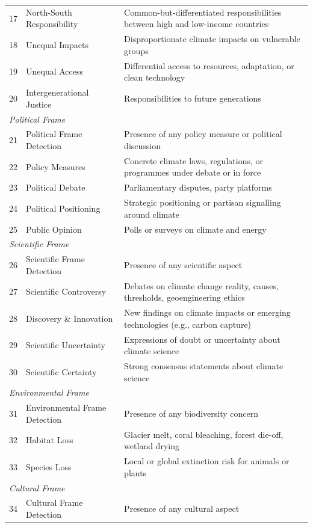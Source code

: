 {\begin{longtable}{p{0.5cm}p{5cm}p{16cm}}
17 & North-South Responsibility & Common-but-differentiated responsibilities between high and low-income countries \\
18 & Unequal Impacts & Disproportionate climate impacts on vulnerable groups \\
19 & Unequal Access & Differential access to resources, adaptation, or clean technology \\
20 & Intergenerational Justice & Responsibilities to future generations \\
\midrule
\multicolumn{3}{l}{\textit{Political Frame}} \\
21 & Political Frame Detection & Presence of any policy measure or political discussion \\
22 & Policy Measures & Concrete climate laws, regulations, or programmes under debate or in force \\
23 & Political Debate & Parliamentary disputes, party platforms \\
24 & Political Positioning & Strategic positioning or partisan signalling around climate \\
25 & Public Opinion & Polls or surveys on climate and energy \\
\midrule
\multicolumn{3}{l}{\textit{Scientific Frame}} \\
26 & Scientific Frame Detection & Presence of any scientific aspect \\
27 & Scientific Controversy & Debates on climate change reality, causes, thresholds, geoengineering ethics \\
28 & Discovery \& Innovation & New findings on climate impacts or emerging technologies (e.g., carbon capture) \\
29 & Scientific Uncertainty & Expressions of doubt or uncertainty about climate science \\
30 & Scientific Certainty & Strong consensus statements about climate science \\
\midrule
\multicolumn{3}{l}{\textit{Environmental Frame}} \\
31 & Environmental Frame Detection & Presence of any biodiversity concern \\
32 & Habitat Loss & Glacier melt, coral bleaching, forest die-off, wetland drying \\
33 & Species Loss & Local or global extinction risk for animals or plants \\
\midrule
\multicolumn{3}{l}{\textit{Cultural Frame}} \\
34 & Cultural Frame Detection & Presence of any cultural aspect \\

\end{longtable}}
